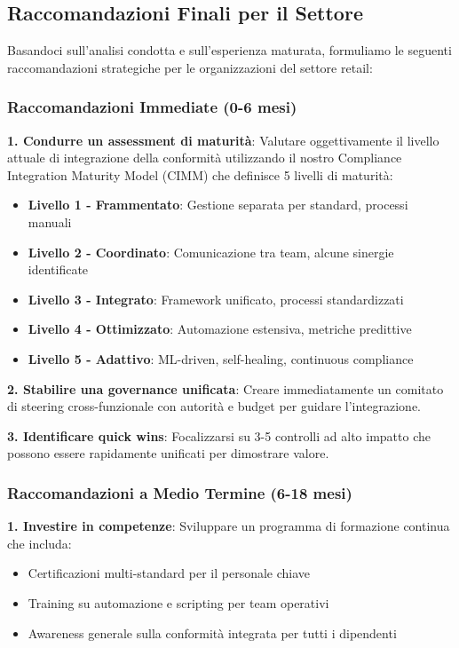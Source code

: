 \subsection{Raccomandazioni Finali per il Settore}
\label{subsec:4.9.3_raccomandazioni}

Basandoci sull'analisi condotta e sull'esperienza maturata, formuliamo le seguenti raccomandazioni strategiche per le organizzazioni del settore retail:

\subsubsection{Raccomandazioni Immediate (0-6 mesi)}

\textbf{1. Condurre un assessment di maturità}:
Valutare oggettivamente il livello attuale di integrazione della conformità utilizzando il nostro Compliance Integration Maturity Model (CIMM) che definisce 5 livelli di maturità:

\begin{itemize}
    \item \textbf{Livello 1 - Frammentato}: Gestione separata per standard, processi manuali
    \item \textbf{Livello 2 - Coordinato}: Comunicazione tra team, alcune sinergie identificate
    \item \textbf{Livello 3 - Integrato}: Framework unificato, processi standardizzati
    \item \textbf{Livello 4 - Ottimizzato}: Automazione estensiva, metriche predittive
    \item \textbf{Livello 5 - Adattivo}: ML-driven, self-healing, continuous compliance
\end{itemize}

\textbf{2. Stabilire una governance unificata}:
Creare immediatamente un comitato di steering cross-funzionale con autorità e budget per guidare l'integrazione.

\textbf{3. Identificare quick wins}:
Focalizzarsi su 3-5 controlli ad alto impatto che possono essere rapidamente unificati per dimostrare valore.

\subsubsection{Raccomandazioni a Medio Termine (6-18 mesi)}

\textbf{1. Investire in competenze}:
Sviluppare un programma di formazione continua che includa:
\begin{itemize}
    \item Certificazioni multi-standard per il personale chiave
    \item Training su automazione e scripting per team operativi
    \item Awareness generale sulla conformità integrata per tutti i dipendenti
\end{itemize}

